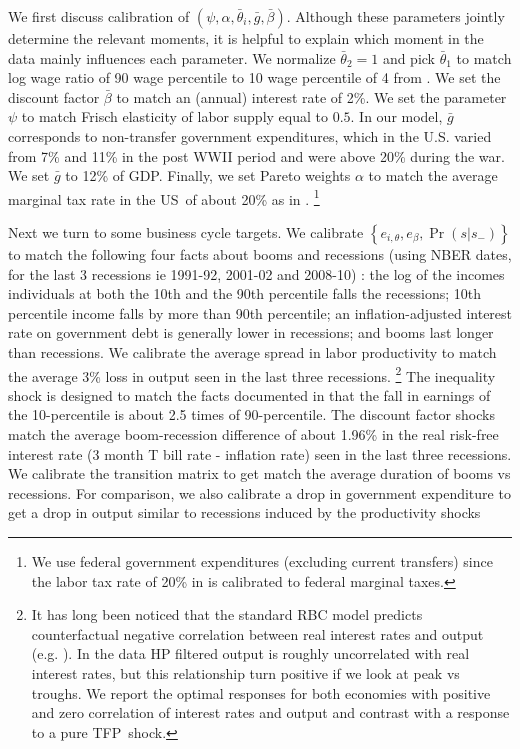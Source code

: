 \documentclass[thmsb,11pt]{article}
\begin{document}
{\smallskip
We first discuss calibration of $\left( \psi ,\alpha ,\bar{\theta}%
_{i},\bar{g},\bar{\beta}\right) $. Although these parameters jointly
determine the relevant moments, it is helpful  to explain which moment
in the data mainly influences each parameter.   We normalize $\bar{\theta}_{2}=1$
and pick $\bar{\theta}_{1}$ to match log wage ratio of 90 wage percentile to
10 wage percentile of 4 from \cite{Autor2008}. We set the discount factor $\bar{\beta}$
 to match an (annual) interest rate of 2\%. We set the parameter $\psi $
to match Frisch elasticity of labor supply equal to $0.5$. In our model, $%
\bar{g}$ corresponds to non-transfer government expenditures, which
in the U.S. varied from 7\%  and  11\% in the post WWII period  and were above 20\% during the war. We set
 $\bar{g}$ to 12\% of GDP. Finally, we set Pareto weights $\alpha $ to match the average
marginal tax rate in the US\ of about 20\% as in \cite{Chari1994}. \footnote{We use federal government expenditures (excluding current transfers) since the labor tax rate of 20\% in  \cite{Chari1994} is calibrated to federal marginal taxes.}

\smallskip Next we turn to some business cycle targets. We calibrate $\left\{
e_{i,\theta },e_{\beta},\Pr \left( s|s_{-}\right) \right\} $ to match the
following four facts about booms and recessions (using NBER dates, for the last 3 recessions ie 1991-92, 2001-02 and 2008-10) : the log of the  incomes individuals at  both the 10th and the 90th percentile falls  the recessions; 10th percentile income falls by
more than 90th percentile; an  inflation-adjusted interest rate on government
debt is generally lower in recessions; and  booms last longer
than recessions. We calibrate the average spread in labor productivity  to
match the average 3\% loss in output seen in the last three recessions.%
\footnote{%
It has long been noticed that the standard RBC model predicts counterfactual
negative correlation between real interest rates and output (e.g. \cite{Boldrin2001}). In the data HP filtered output is roughly uncorrelated with real
interest rates, but this relationship turn positive if we look at peak vs
troughs. We report the optimal responses for both economies with positive
and zero correlation of interest rates and output and contrast with a
response to a pure TFP\ shock.} The inequality shock is designed to match
the facts documented in \cite{NBERw18035} that the fall in earnings of
the 10-percentile is about 2.5 times of 90-percentile.
 The discount factor shocks
match the average boom-recession difference of about 1.96\% in the real
risk-free interest rate (3 month T bill rate - inflation rate) seen in the
last three recessions. We calibrate the transition matrix  to get match the
average duration of booms vs recessions.
 For comparison, we also calibrate a drop in government expenditure to get a
drop in output  similar to recessions induced by the productivity shocks

}
\end{document}
